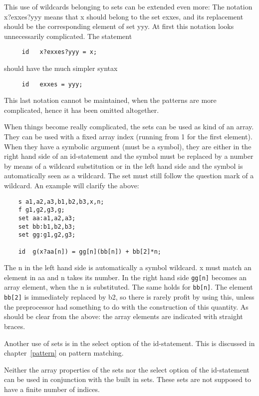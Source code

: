 This use of wildcards belonging to sets can be extended even more: 
The notation x?exxes?yyy means that x should belong to the set exxes, and
its replacement should be the corresponding element of set yyy. At first 
this notation looks unnecessarily complicated. The statement 
\begin{verbatim}
     id   x?exxes?yyy = x;
\end{verbatim}
should have the much simpler syntax
\begin{verbatim}
     id   exxes = yyy;
\end{verbatim}
This last notation cannot be maintained, when the patterns are more 
complicated, hence it has been omitted altogether.

When things become really complicated, the sets can be 
used as kind of an array. They can be used with a fixed array index 
(running from 1 for the first element). When they have a symbolic argument 
(must be a symbol), they are either in the right hand side of an 
id-statement and the symbol must be replaced by a number by means of a 
wildcard substitution or in the left hand side and the symbol is 
automatically seen as a wildcard. The set must still follow the question 
mark of a wildcard. An example will clarify the above:
\begin{verbatim}
    s a1,a2,a3,b1,b2,b3,x,n;
    f g1,g2,g3,g;
    set aa:a1,a2,a3;
    set bb:b1,b2,b3;
    set gg:g1,g2,g3;
   
    id  g(x?aa[n]) = gg[n](bb[n]) + bb[2]*n;
\end{verbatim}
The n in the left hand side is automatically a symbol wildcard. x must 
match an element in aa and n takes its number. In the right hand side 
\verb:gg[n]: becomes an array element, when the n is substituted. The 
same holds for \verb:bb[n]:. The element \verb:bb[2]: is immediately 
replaced by b2, so there is rarely profit by using this, unless the 
preprocessor had something to do with the construction of this 
quantity. As should be clear from the above: the array elements are 
indicated with straight braces. 

Another use of sets is in the select  
option of the id-statement. This is discussed in 
chapter~\ref{pattern} on pattern matching. 

Neither the array properties of the sets nor the select option of the 
id-statement can be used in conjunction with the built in sets. These 
sets are not supposed to have a finite number of indices.

